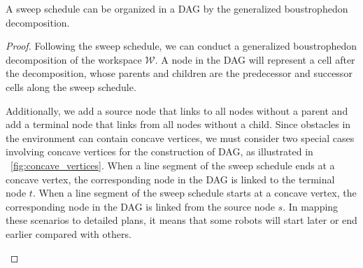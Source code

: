 \begin{theorem}
A sweep schedule can be organized in a DAG by the generalized boustrophedon decomposition.
\end{theorem}

\begin{proof}
Following the sweep schedule, we can conduct a generalized boustrophedon 
decomposition of the workspace $\mathcal W$. 
%
A node in the DAG will represent a cell after the decomposition, whose 
parents and children are the predecessor and successor cells along the 
sweep schedule. 

Additionally, we add a source node that links to all nodes without a parent 
and add a terminal node that links from all nodes without a child.
%
Since obstacles in the environment can contain concave vertices, we must 
consider two special cases involving concave vertices for the construction of DAG, 
as illustrated in ~\ref{fig:concave_vertices}. 
%
When a line segment of the sweep schedule ends at a concave vertex, 
the corresponding node in the DAG is linked to the terminal node $t$.
When a line segment of the sweep schedule starts at a concave vertex,
the corresponding node in the DAG is linked from the source node $s$.
In mapping these scenarios to detailed plans, it means that 
some robots will start later or end earlier compared with 
others.

\begin{figure} [ht]
    \centering
\end{figure}
\end{proof}
